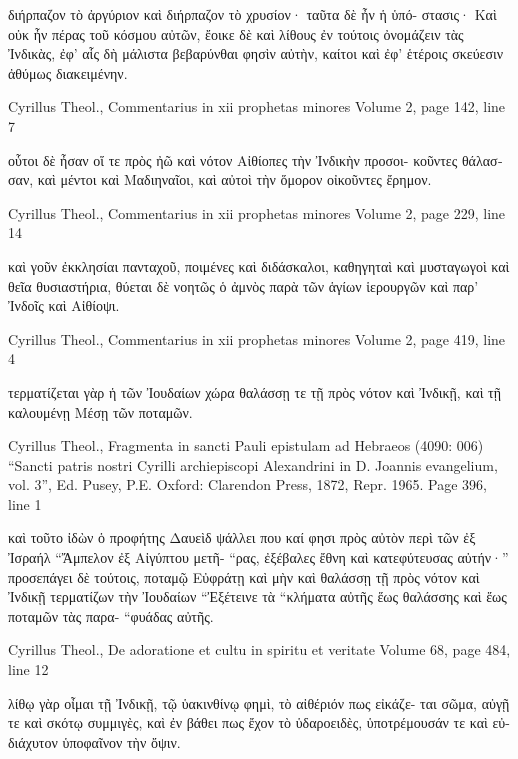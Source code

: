 \documentclass[12pt,letterpaper,twoside,final]{memoir}
\begin{document}
\begin{greek}
                                                         διήρπαζον 
τὸ ἀργύριον καὶ διήρπαζον τὸ χρυσίον· ταῦτα δὲ ἦν ἡ ὑπό-
στασις· Καὶ οὐκ ἦν πέρας τοῦ κόσμου αὐτῶν, ἔοικε δὲ καὶ 
λίθους ἐν τούτοις ὀνομάζειν τὰς Ἰνδικὰς, ἐφ' αἷς δὴ μάλιστα 
βεβαρύνθαι φησὶν αὐτὴν, καίτοι καὶ ἐφ' ἑτέροις σκεύεσιν 
ἀθύμως διακειμένην. 



Cyrillus Theol., Commentarius in xii prophetas minores 
Volume 2, page 142, line 7

                                                      οὗτοι δὲ 
ἦσαν οἵ τε πρὸς ἠῶ καὶ νότον Αἰθίοπες τὴν Ἰνδικὴν προσοι-
κοῦντες θάλασσαν, καὶ μέντοι καὶ Μαδιηναῖοι, καὶ αὐτοὶ τὴν 
ὅμορον οἰκοῦντες ἔρημον. 



Cyrillus Theol., Commentarius in xii prophetas minores 
Volume 2, page 229, line 14

                                                    καὶ γοῦν 
ἐκκλησίαι πανταχοῦ, ποιμένες καὶ διδάσκαλοι, καθηγηταὶ 
καὶ μυσταγωγοὶ καὶ θεῖα θυσιαστήρια, θύεται δὲ νοητῶς ὁ 
ἀμνὸς παρὰ τῶν ἁγίων ἱερουργῶν καὶ παρ' Ἰνδοῖς καὶ 
Αἰθίοψι. 



Cyrillus Theol., Commentarius in xii prophetas minores 
Volume 2, page 419, line 4

                                 τερματίζεται γὰρ ἡ τῶν 
Ἰουδαίων χώρα θαλάσσῃ τε τῇ πρὸς νότον καὶ Ἰνδικῇ, καὶ 
τῇ καλουμένῃ Μέσῃ τῶν ποταμῶν. 



Cyrillus Theol., Fragmenta in sancti Pauli epistulam ad Hebraeos (4090: 006)
“Sancti patris nostri Cyrilli archiepiscopi Alexandrini in D. Joannis evangelium, vol. 3”, Ed. Pusey, P.E.
Oxford: Clarendon Press, 1872, Repr. 1965.
Page 396, line 1

                                                            καὶ 
τοῦτο ἰδὼν ὁ προφήτης Δαυεὶδ ψάλλει που καί φησι πρὸς 
αὐτὸν περὶ τῶν ἐξ Ἰσραήλ “Ἄμπελον ἐξ Αἰγύπτου μετῆ-
“ρας, ἐξέβαλες ἔθνη καὶ κατεφύτευσας αὐτήν·” προσεπάγει 
δὲ τούτοις, ποταμῷ Εὐφράτῃ καὶ μὴν καὶ θαλάσσῃ τῇ πρὸς   
νότον καὶ Ἰνδικῇ τερματίζων τὴν Ἰουδαίων “Ἐξέτεινε τὰ 
“κλήματα αὐτῆς ἕως θαλάσσης καὶ ἕως ποταμῶν τὰς παρα-
“φυάδας αὐτῆς. 




Cyrillus Theol., De adoratione et cultu in spiritu et veritate 
Volume 68, page 484, line 12

                                      λίθῳ γὰρ οἶμαι τῇ 
Ἰνδικῇ, τῷ ὑακινθίνῳ φημὶ, τὸ αἰθέριόν πως εἰκάζε-
ται σῶμα, αὐγῇ τε καὶ σκότῳ συμμιγὲς, καὶ ἐν βάθει 
πως ἔχον τὸ ὑδαροειδὲς, ὑποτρέμουσάν τε καὶ εὐ-
διάχυτον ὑποφαῖνον τὴν ὄψιν. 




\end{greek}
\end{document}
